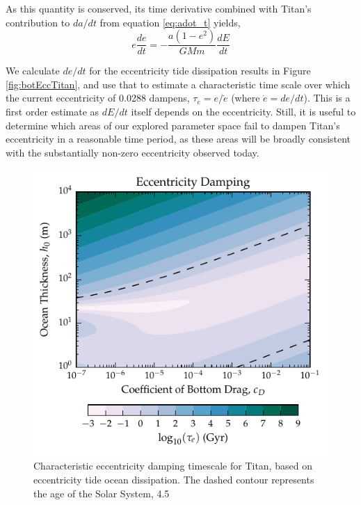 As this quantity is conserved, its time derivative combined with Titan's contribution to $da/dt$ from equation \ref{eq:adot_t} yields,
\begin{equation}\label{eq:adot_edot}
e\dfrac{de}{dt} = - \dfrac{a (1-e^2)}{GMm} \dfrac{dE}{dt}
\end{equation}

We calculate $de/dt$ for the eccentricity tide dissipation results in Figure \ref{fig:botEccTitan}, and use that to estimate a characteristic time scale over which the current eccentricity of 0.0288 dampens, $\tau_e = e/\dot{e}$ (where $\dot{e} = de/dt$). This is a first order estimate as $dE/dt$ itself depends on the eccentricity. Still, it is useful to determine which areas of our explored parameter space fail to dampen Titan's eccentricity in a reasonable time period, as these areas will be broadly consistent with the substantially non-zero eccentricity observed today.

\begin{figure}[!t]
\centering
\includegraphics[width=0.55\linewidth]{Figures/eccentricity}
\caption{Characteristic eccentricity damping timescale for Titan, based on eccentricity tide ocean dissipation. The dashed contour represents the age of the Solar System, \SI{4.5}{\giga\year} \label{fig:edotTitan}}
\end{figure}

